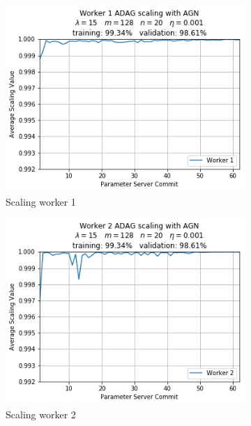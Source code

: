 \begin{figure}
\begin{subfigure}{.24\textwidth}
    \includegraphics[width=\linewidth]{resources/images/plots/adag_agn_mnist/epoch_40/15/001/scaling/worker_1}
    \caption{Scaling worker 1}
  \end{subfigure}
  \begin{subfigure}{.24\textwidth}
    \centering
    \includegraphics[width=\linewidth]{resources/images/plots/adag_agn_mnist/epoch_40/15/001/scaling/worker_2}
    \caption{Scaling worker 2}
  \end{subfigure}
  \begin{subfigure}{.24\textwidth}
    \centering

\end{subfigure}
\end{figure}
